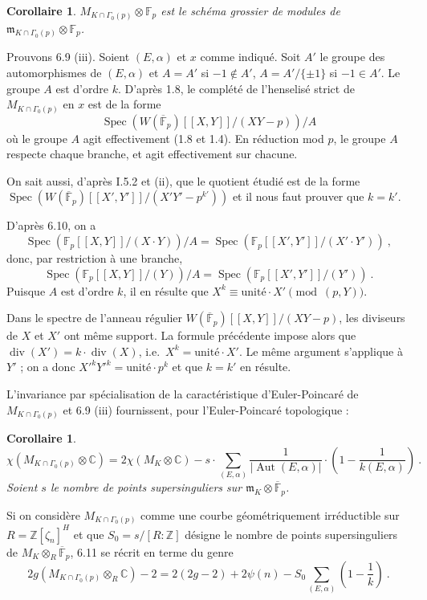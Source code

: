 \documentclass[10pt,a4paper]{amsart}
\theoremstyle{plain}
\newtheorem{corollary}[theorem]{Corollaire}
\theoremstyle{definition}
\DeclareMathOperator{\Spec}{Spec}
\DeclareMathOperator{\Aut}{Aut}
\DeclareMathOperator{\divv}{div}
\newcommand{\m}{\mathfrak{m}}
\newcommand{\FF}{\mathbb{F}}
\newcommand{\ZZ}{\mathbb{Z}}
\newcommand{\CC}{\mathbb{C}}
\begin{document}
\begin{corollary}
$M_{K \cap \Gamma_0(p)} \otimes \FF_p$ est le sch\'ema grossier de modules de $\m_{K \cap \Gamma_0(p)} \otimes \FF_p$.
\end{corollary}

Prouvons 6.9 (iii). Soient $(E,\alpha)$ et $x$ comme indiqu\'e. Soit $A'$ le groupe des automorphismes de $(E,\alpha)$ et $A = A'$ si $-1 \not\in A'$, $A = A'/\{\pm 1\}$ si $-1 \in A'$. Le groupe $A$ est d'ordre $k$. D'apr\`es 1.8, le compl\'et\'e de l'henselis\'e strict de $M_{K \cap \Gamma_0(p)}$ en $x$ est de la forme
\[
\Spec(W(\overline{\FF}_p)[[X,Y]]/(XY - p)) / A
\]
o\`u le groupe $A$ agit effectivement (1.8 et 1.4). En r\'eduction mod $p$, le groupe $A$ respecte chaque branche, et agit effectivement sur chacune.

On sait aussi, d'apr\`es I.5.2 et (ii), que le quotient \'etudi\'e est de la forme $\Spec(W(\overline{\FF}_p)[[X',Y']]/(X'Y' - p^{k'}))$ et il nous faut prouver que $k = k'$.

D'apr\`es 6.10, on a
\[
\Spec(\FF_p[[X,Y]]/(X \cdot Y))/A = \Spec(\FF_p[[X',Y']]/(X' \cdot Y'))\ ,
\]
donc, par restriction \`a une branche,
\[
\Spec(\FF_p[[X,Y]]/(Y))/A = \Spec(\FF_p[[X',Y']]/(Y'))\ .
\]
Puisque $A$ est d'ordre $k$, il en r\'esulte que $X^k \equiv \text{unit\'e} \cdot X' \pmod{(p,Y)}$.

Dans le spectre de l'anneau r\'egulier $W(\overline{\FF}_p)[[X,Y]]/(XY-p)$, les diviseurs de $X$ et $X'$ ont m\^eme support. La formule pr\'ec\'edente impose alors que $\divv(X') = k \cdot \divv(X)$, i.e.\ $X^k = \text{unit\'e} \cdot X'$. Le m\^eme argument s'applique \`a $Y'$ ; on a donc $X'^k Y'^k = \text{unit\'e} \cdot p^k$ et que $k = k'$ en r\'esulte.

L'invariance par sp\'ecialisation de la caract\'eristique d'Euler-Poincar\'e de $M_{K \cap \Gamma_0(p)}$ et 6.9 (iii) fournissent, pour l'Euler-Poincar\'e topologique :

\begin{corollary}
\begin{equation}
\chi(M_{K \cap \Gamma_0(p)} \otimes \CC) = 2\chi(M_K \otimes \CC) - s \cdot \sum_{(E,\alpha)} \frac{1}{|\Aut(E,\alpha)|} \cdot (1 - \frac{1}{k(E,\alpha)})\ .
\end{equation}
Soient $s$ le nombre de points supersinguliers sur $\m_K \otimes \overline{\FF}_p$.
\end{corollary}

Si on consid\`ere $M_{K \cap \Gamma_0(p)}$ comme une courbe g\'eom\'etriquement irr\'eductible sur $R = \ZZ[\zeta_n]^H$ et que $S_0 = s/[R:\ZZ]$ d\'esigne le nombre de points supersinguliers de $M_K \otimes_R \overline{\FF}_p$, 6.11 se r\'ecrit en terme du genre
\begin{equation}
2g(M_{K \cap \Gamma_0(p)} \otimes_R \CC) - 2 = 2(2g - 2) + 2\psi(n) - S_0 \sum_{(E,\alpha)} (1 - \frac{1}{k})\ .
\end{equation}
\end{document}

